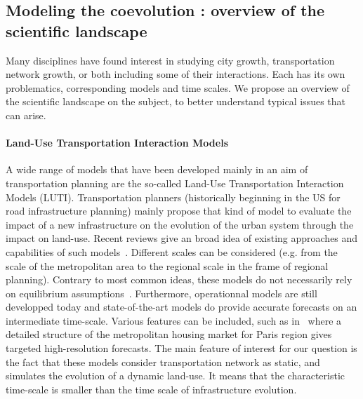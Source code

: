 \subsection{Modeling the coevolution : overview of the scientific landscape}


Many disciplines have found interest in studying city growth, transportation network growth, or both including some of their interactions. Each has its own problematics, corresponding models and time scales. We propose an overview of the scientific landscape on the subject, to better understand typical issues that can arise.

\paragraph{Land-Use Transportation Interaction Models}

A wide range of models that have been developed mainly in an aim of transportation planning are the so-called Land-Use Transportation Interaction Models (LUTI). Transportation planners (historically beginning in the US for road infrastructure planning) mainly propose that kind of model to evaluate the impact of a new infrastructure on the evolution of the urban system through the impact on land-use.
Recent reviews give an broad idea of existing approaches and capabilities of such models~\cite{chang2006models,iacono2008models,wegener2004land}. Different scales can be considered (e.g. from the scale of the metropolitan area
to the regional scale in the frame of regional planning).
Contrary to most common ideas, these models do not necessarily rely on equilibrium assumptions~\cite{kryvobokov2013comparison}. Furthermore, operationnal models are still developped today and state-of-the-art models do provide accurate forecasts on an intermediate time-scale. Various features can be included, such as in~\cite{delons:hal-00319087} where a detailed structure of the metropolitan housing market for Paris region gives targeted high-resolution forecasts. The main feature of interest for our question is the fact that these models consider transportation network as static, and simulates the evolution of a dynamic land-use. It means that the characteristic time-scale is smaller than the time scale of infrastructure evolution.


